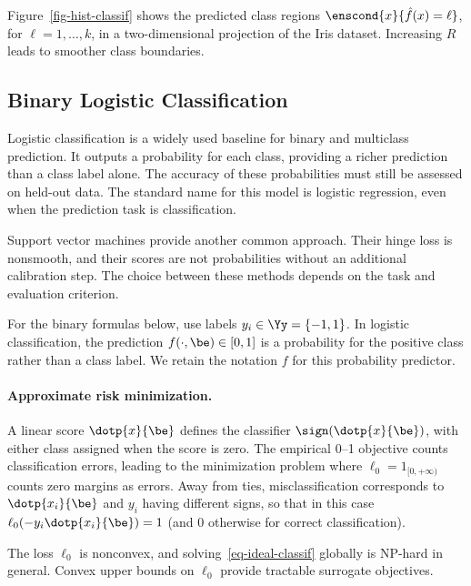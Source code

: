 Figure~\ref{fig-hist-classif} shows the predicted class regions $\enscond{x}{\hat f(x)=\ell}$, for $\ell=1,\ldots,k$, in a two-dimensional projection of the Iris dataset.
%
Increasing $R$ leads to smoother class boundaries.

\subsection{Binary Logistic Classification}
\label{sec-two-class-logit}

Logistic classification is a widely used baseline for binary and multiclass prediction. It outputs a probability for each class, providing a richer prediction than a class label alone. The accuracy of these probabilities must still be assessed on held-out data.
%
The standard name for this model is logistic regression, even when the prediction task is classification.

Support vector machines provide another common approach. Their hinge loss is nonsmooth, and their scores are not probabilities without an additional calibration step. The choice between these methods depends on the task and evaluation criterion.

For the binary formulas below, use labels $y_i \in \Yy = \{-1,1\}$. In logistic classification, the prediction $f(\cdot,\be) \in [0,1]$ is a probability for the positive class rather than a class label. We retain the notation $f$ for this probability predictor.


\paragraph{Approximate risk minimization.}

A linear score $\dotp{x}{\be}$ defines the classifier $\sign(\dotp{x}{\be})$, with either class assigned when the score is zero. The empirical 0--1 objective counts classification errors, leading to the minimization problem
where $\ell_0=1_{[0,+\infty)}$ counts zero margins as errors. Away from ties, misclassification corresponds to $\dotp{x_i}{\be}$ and $y_i$ having different signs, so that in this case $\ell_0(-y_i \dotp{x_i}{\be})=1$ (and 0 otherwise for correct classification).

The loss $\ell_0$ is nonconvex, and solving~\eqref{eq-ideal-classif} globally is NP-hard in general. Convex upper bounds on $\ell_0$ provide tractable surrogate objectives.

